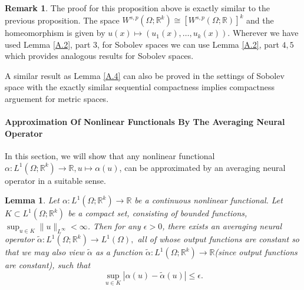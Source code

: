 \documentclass[reqno,9pt]{amsart}
\theoremstyle{plain}
\newtheorem{lem}{Lemma}
\theoremstyle{definition}
\newtheorem{rem}{Remark}
\newcommand{\bb}[1]{\mathbb{#1}}
\begin{document}
\begin{rem}
    The proof for this proposition above is exactly similar to the previous proposition. The space $W^{s,p}(\Omega;\bb R^k) \cong [W^{s,p}(\Omega; \bb R)]^k$ and the homeomorphism is given by $u(x) \mapsto (u_1(x),\dots,u_k(x))$. Wherever we have used Lemma \ref{A.2}, part $3$, for Sobolev spaces we can use Lemma \ref{A.2}, part $4,5$ which provides analogous results for Sobolev spaces.

    \noindent A similar result as Lemma \ref{A.4} can also be proved in the settings of Sobolev space with the exactly similar sequential compactness implies compactness arguement for metric spaces.
\end{rem}
\paragraph{\bf Approximation Of Nonlinear Functionals By The Averaging Neural Operator}
In this section, we will show that any nonlinear functional $\alpha: L^1(\Omega; \bb R^k) \to \bb R, u \mapsto \alpha(u)$, can be approximated by an averaging neural operator in a suitable sense.
\begin{lem}\label{A.9}
    Let $\alpha:L^1(\Omega;\bb R^k) \to \bb R$ be a continuous nonlinear functional. Let $K \subset L^1(\Omega; \bb R^k)$ be a compact set, consisting of bounded functions, $\sup_{u \in K} \|u\|_{L^\infty} < \infty$. Then for any $\epsilon > 0$, there exists an averaging neural operator $\tilde{\alpha} : L^1(\Omega; \bb R^k) \to L^1(\Omega),$ all of whose output functions are constant so that we may also view $\tilde{\alpha}$ as a function $\tilde{\alpha} : L^1(\Omega; \bb R^k) \to \bb R$(since output functions are constant), such that
    $$ \sup\limits_{u \in K} |\alpha(u) - \tilde{\alpha}(u)| \leq \epsilon.$$
\end{lem}
\end{document}
